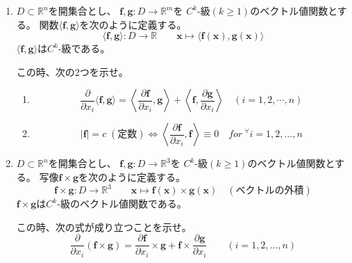 \documentclass[12pt,b5paper]{ltjsarticle}
\begin{document}
\hrulefill

\begin{enumerate}
 \item
       $D \subset \mathbb{R}^n$を開集合とし、
       $\bm{f},\bm{g} : D\rightarrow \mathbb{R}^m$を
       $C^{k}$-級$(k\geq 1)$のベクトル値関数とする。
       関数$\langle \bm{f},\bm{g}\rangle$を次のように定義する。
       \begin{equation}
        \langle \bm{f},\bm{g}\rangle : D\rightarrow \mathbb{R}
         \qquad \bm{x} \mapsto
         \langle \bm{f}(\bm{x}),\bm{g}(\bm{x})\rangle
       \end{equation}
       $\langle \bm{f},\bm{g}\rangle$は$C^{k}$-級である。

       この時、次の2つを示せ。
       \begin{enumerate}
        \item
             \begin{equation}
              \frac{\partial}{\partial x_i}\langle \bm{f},\bm{g}\rangle
               = \left\langle \frac{\partial \bm{f}}{\partial x_i},\bm{g}\right\rangle
               + \left\langle \bm{f}, \frac{\partial \bm{g}}{\partial x_i}\right\rangle
               \quad (i=1,2,\cdots,n)
             \end{equation}
        \item
             \begin{equation}
              \lvert \bm{f} \rvert = c\; (\text{定数})
               \Leftrightarrow
               \left\langle \frac{\partial \bm{f}}{\partial x_i},\bm{f}\right\rangle
               \equiv 0
               \quad for \ {}^{\forall}i=1,2,\dots,n
             \end{equation}
       \end{enumerate}

\dotfill

 \item
       $D \subset \mathbb{R}^n$を開集合とし、
       $\bm{f},\bm{g} : D\rightarrow \mathbb{R}^3$を
       $C^{k}$-級$(k\geq 1)$のベクトル値関数とする。
       写像$\bm{f}\times\bm{g}$を次のように定義する。
       \begin{equation}
        \bm{f}\times\bm{g} : D\rightarrow \mathbb{R}^3
         \qquad \bm{x} \mapsto
         \bm{f}(\bm{x})\times\bm{g}(\bm{x}) \quad (\text{ベクトルの外積})
       \end{equation}
       $\bm{f}\times\bm{g}$は$C^{k}$-級のベクトル値関数である。

       この時、次の式が成り立つことを示せ。
       \begin{equation}
        \frac{\partial}{\partial x_i}(\bm{f}\times\bm{g})
         = \frac{\partial \bm{f}}{\partial x_i}\times\bm{g}
         + \bm{f}\times\frac{\partial \bm{g}}{\partial x_i}
         \qquad (i=1,2,\dots,n)
       \end{equation}
\end{enumerate}
\end{document}

